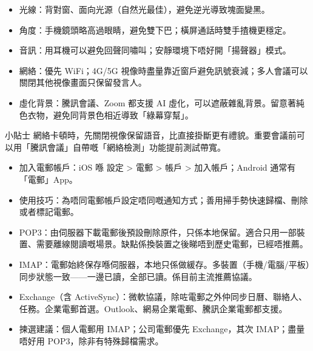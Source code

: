 
\begin{itemize}
  \item 光線：背對窗、面向光源（自然光最佳），避免逆光導致塊面變黑。
  \item 角度：手機鏡頭略高過眼睛，避免雙下巴；橫屏通話時雙手揸機更穩定。
  \item 音訊：用耳機可以避免回聲同嘯叫；安靜環境下唔好開「揚聲器」模式。
  \item 網絡：優先 WiFi；4G/5G 視像時盡量靠近窗戶避免訊號衰減；多人會議可以關閉其他視像畫面只保留發言人。
  \item 虛化背景：騰訊會議、Zoom 都支援 AI 虛化，可以遮蔽雜亂背景。留意著純色衣物，避免同背景色相近導致「綠幕穿幫」。
\end{itemize}

\begin{tcbinfo}{小貼士}
網絡卡頓時，先關閉視像保留語音，比直接掛斷更有禮貌。重要會議前可以用「騰訊會議」自帶嘅「網絡檢測」功能提前測試帶寬。

\end{tcbinfo}


\begin{itemize}
  \item 加入電郵帳戶：iOS 喺 設定 > 電郵 > 帳戶 > 加入帳戶；Android 通常有「電郵」App。
  \item 使用技巧：為唔同電郵帳戶設定唔同嘅通知方式；善用掃手勢快速歸檔、刪除或者標記電郵。
\end{itemize}


\begin{itemize}
  \item POP3：由伺服器下載電郵後預設刪除原件，只係本地保留。適合只用一部裝置、需要離線閱讀嘅場景。缺點係換裝置之後睇唔到歷史電郵，已經唔推薦。
  \item IMAP：電郵始終保存喺伺服器，本地只係做緩存。多裝置（手機/電腦/平板）同步狀態一致——一邊已讀，全部已讀。係目前主流推薦協議。
  \item Exchange（含 ActiveSync）：微軟協議，除咗電郵之外仲同步日曆、聯絡人、任務。企業電郵首選。Outlook、網易企業電郵、騰訊企業電郵都支援。
  \item 揀選建議：個人電郵用 IMAP；公司電郵優先 Exchange，其次 IMAP；盡量唔好用 POP3，除非有特殊歸檔需求。
\end{itemize}

